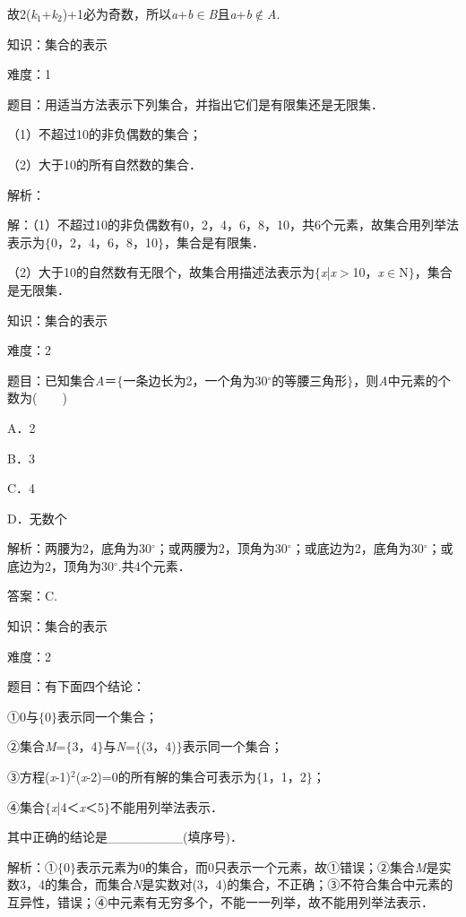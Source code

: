 \documentclass{article} %
\begin{document}
故2(\textit{k}${}_{1}$+\textit{k}${}_{2}$)+1必为奇数，所以\textit{a}+\textit{b}$\mathrm{\in}$\textit{B}且\textit{a}+\textit{b}$\mathrm{\notin}$\textit{A}.

知识：集合的表示

难度：1

题目：用适当方法表示下列集合，并指出它们是有限集还是无限集．

（1）不超过10的非负偶数的集合；

（2）大于10的所有自然数的集合．

解析：

解：（1）不超过10的非负偶数有0，2，4，6，8，10，共6个元素，故集合用列举法表示为$\mathrm{\{}$0，2，4，6，8，10$\mathrm{\}}$，集合是有限集．

（2）大于10的自然数有无限个，故集合用描述法表示为$\mathrm{\{}$\textit{x}|\textit{x}$\mathrm{>}$10，\textit{x}$\mathrm{\in}$N$\mathrm{\}}$，集合是无限集．

知识：集合的表示

难度：2

题目：已知集合\textit{A}＝$\mathrm{\{}$一条边长为2，一个角为30$\mathrm{{}^\circ}$的等腰三角形$\mathrm{\}}$，则\textit{A}中元素的个数为(　　)

A．2　　　　

B．3　　　　

C．4　　　

D．无数个

解析：两腰为2，底角为30$\mathrm{{}^\circ}$；或两腰为2，顶角为30$\mathrm{{}^\circ}$；或底边为2，底角为30$\mathrm{{}^\circ}$；或底边为2，顶角为30$\mathrm{{}^\circ}$.共4个元素．

答案：C.

知识：集合的表示

难度：2

题目：有下面四个结论：

①0与$\mathrm{\{}$0$\mathrm{\}}$表示同一个集合；

②集合\textit{M}=$\mathrm{\{}$3，4$\mathrm{\}}$与\textit{N}=$\mathrm{\{}$(3，4)$\mathrm{\}}$表示同一个集合；

③方程(\textit{x}-1)${}^{2}$(\textit{x}-2)=0的所有解的集合可表示为$\mathrm{\{}$1，1，2$\mathrm{\}}$；

④集合$\mathrm{\{}$\textit{x}|4＜\textit{x}＜5$\mathrm{\}}$不能用列举法表示．

其中正确的结论是\_\_\_\_\_\_\_\_(填序号)．

解析：①$\mathrm{\{}$0$\mathrm{\}}$表示元素为0的集合，而0只表示一个元素，故①错误；②集合\textit{M}是实数3，4的集合，而集合\textit{N}是实数对(3，4)的集合，不正确；③不符合集合中元素的互异性，错误；④中元素有无穷多个，不能一一列举，故不能用列举法表示．
\end{document}
